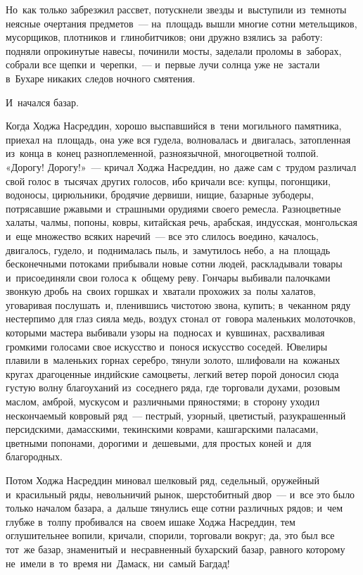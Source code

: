 \documentclass[12pt,a4paper]{book}
\begin{document}
Но~как только забрезжил рассвет, потускнели звезды и~выступили из~темноты неясные очертания предметов~— на~площадь вышли многие сотни метельщиков, мусорщиков, плотников и~глинобитчиков; они дружно взялись за~работу: подняли опрокинутые навесы, починили мосты, заделали проломы в~заборах, собрали все щепки и~черепки,~— и~первые лучи солнца уже не~застали в~Бухаре никаких следов ночного смятения.

И~начался базар.

Когда Ходжа Насреддин, хорошо выспавшийся в~тени могильного памятника, приехал на~площадь, она уже вся гудела, волновалась и~двигалась, затопленная из~конца в~конец разноплеменной, разноязычной, многоцветной толпой. «Дорогу! Дорогу!»~— кричал Ходжа Насреддин, но~даже сам с~трудом различал свой голос в~тысячах других голосов, ибо кричали все: купцы, погонщики, водоносы, цирюльники, бродячие дервиши, нищие, базарные зубодеры, потрясавшие ржавыми и~страшными орудиями своего ремесла. Разноцветные халаты, чалмы, попоны, ковры, китайская речь, арабская, индусская, монгольская и~еще множество всяких наречий~— все это слилось воедино, качалось, двигалось, гудело, и~поднималась пыль, и~замутилось небо, а~на~площадь бесконечными потоками прибывали новые сотни людей, раскладывали товары и~присоединяли свои голоса к~общему реву. Гончары выбивали палочками звонкую дробь на~своих горшках и~хватали прохожих за~полы халатов, уговаривая послушать~и, пленившись чистотою звона, купить; в~чеканном ряду нестерпимо для глаз сияла медь, воздух стонал от~говора маленьких молоточков, которыми мастера выбивали узоры на~подносах и~кувшинах, расхваливая громкими голосами свое искусство и~понося искусство соседей. Ювелиры плавили в~маленьких горнах серебро, тянули золото, шлифовали на~кожаных кругах драгоценные индийские самоцветы, легкий ветер порой доносил сюда густую волну благоуханий из~соседнего ряда, где торговали духами, розовым маслом, амброй, мускусом и~различными пряностями; в~сторону уходил нескончаемый ковровый ряд~— пестрый, узорный, цветистый, разукрашенный персидскими, дамасскими, текинскими коврами, кашгарскими паласами, цветными попонами, дорогими и~дешевыми, для простых коней и~для благородных.

Потом Ходжа Насреддин миновал шелковый ряд, седельный, оружейный и~красильный ряды, невольничий рынок, шерстобитный двор~— и~все это было только началом базара, а~дальше тянулись еще сотни различных рядов; и~чем глубже в~толпу пробивался на~своем ишаке Ходжа Насреддин, тем оглушительнее вопили, кричали, спорили, торговали вокруг; да, это был все тот~же базар, знаменитый и~несравненный бухарский базар, равного которому не~имели в~то~время ни~Дамаск, ни~самый Багдад!
\end{document}
